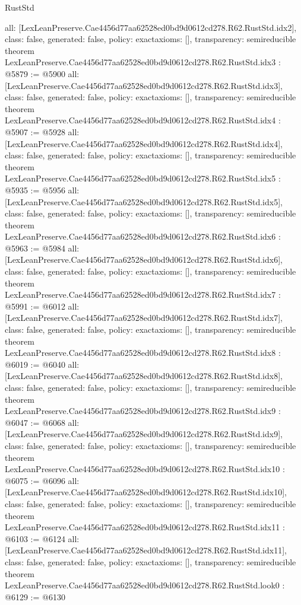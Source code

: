 \begin{lexlean}{RustStd}
\begin{coremodule}
{  all: [LexLeanPreserve.Cae4456d77aa62528ed0bd9d0612cd278.R62.RustStd.idx2],
  class: false,
  generated: false,
  policy: exact{axioms: []},
  transparency: semireducible
}
theorem LexLeanPreserve.Cae4456d77aa62528ed0bd9d0612cd278.R62.RustStd.idx3 : @5879 := @5900 {
  all: [LexLeanPreserve.Cae4456d77aa62528ed0bd9d0612cd278.R62.RustStd.idx3],
  class: false,
  generated: false,
  policy: exact{axioms: []},
  transparency: semireducible
}
theorem LexLeanPreserve.Cae4456d77aa62528ed0bd9d0612cd278.R62.RustStd.idx4 : @5907 := @5928 {
  all: [LexLeanPreserve.Cae4456d77aa62528ed0bd9d0612cd278.R62.RustStd.idx4],
  class: false,
  generated: false,
  policy: exact{axioms: []},
  transparency: semireducible
}
theorem LexLeanPreserve.Cae4456d77aa62528ed0bd9d0612cd278.R62.RustStd.idx5 : @5935 := @5956 {
  all: [LexLeanPreserve.Cae4456d77aa62528ed0bd9d0612cd278.R62.RustStd.idx5],
  class: false,
  generated: false,
  policy: exact{axioms: []},
  transparency: semireducible
}
theorem LexLeanPreserve.Cae4456d77aa62528ed0bd9d0612cd278.R62.RustStd.idx6 : @5963 := @5984 {
  all: [LexLeanPreserve.Cae4456d77aa62528ed0bd9d0612cd278.R62.RustStd.idx6],
  class: false,
  generated: false,
  policy: exact{axioms: []},
  transparency: semireducible
}
theorem LexLeanPreserve.Cae4456d77aa62528ed0bd9d0612cd278.R62.RustStd.idx7 : @5991 := @6012 {
  all: [LexLeanPreserve.Cae4456d77aa62528ed0bd9d0612cd278.R62.RustStd.idx7],
  class: false,
  generated: false,
  policy: exact{axioms: []},
  transparency: semireducible
}
theorem LexLeanPreserve.Cae4456d77aa62528ed0bd9d0612cd278.R62.RustStd.idx8 : @6019 := @6040 {
  all: [LexLeanPreserve.Cae4456d77aa62528ed0bd9d0612cd278.R62.RustStd.idx8],
  class: false,
  generated: false,
  policy: exact{axioms: []},
  transparency: semireducible
}
theorem LexLeanPreserve.Cae4456d77aa62528ed0bd9d0612cd278.R62.RustStd.idx9 : @6047 := @6068 {
  all: [LexLeanPreserve.Cae4456d77aa62528ed0bd9d0612cd278.R62.RustStd.idx9],
  class: false,
  generated: false,
  policy: exact{axioms: []},
  transparency: semireducible
}
theorem LexLeanPreserve.Cae4456d77aa62528ed0bd9d0612cd278.R62.RustStd.idx10 : @6075 := @6096 {
  all: [LexLeanPreserve.Cae4456d77aa62528ed0bd9d0612cd278.R62.RustStd.idx10],
  class: false,
  generated: false,
  policy: exact{axioms: []},
  transparency: semireducible
}
theorem LexLeanPreserve.Cae4456d77aa62528ed0bd9d0612cd278.R62.RustStd.idx11 : @6103 := @6124 {
  all: [LexLeanPreserve.Cae4456d77aa62528ed0bd9d0612cd278.R62.RustStd.idx11],
  class: false,
  generated: false,
  policy: exact{axioms: []},
  transparency: semireducible
}
theorem LexLeanPreserve.Cae4456d77aa62528ed0bd9d0612cd278.R62.RustStd.look0 : @6129 := @6130 {
}
\end{coremodule}
\end{lexlean}

